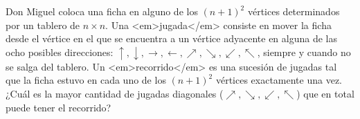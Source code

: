 Don Miguel coloca una ficha en alguno de los $(n+1)^2$ vértices determinados por un tablero de $n \times n$. Una <em>jugada</em> consiste en mover la ficha desde el vértice en el que se encuentra a un vértice adyacente en alguna de las ocho posibles direcciones: $\uparrow, \downarrow, \rightarrow, \leftarrow, \nearrow, \searrow, \swarrow, \nwarrow$, siempre y cuando no se salga del tablero. Un <em>recorrido</em> es una sucesión de jugadas tal que la ficha estuvo en cada uno de los $(n+1)^2$ vértices exactamente una vez. ¿Cuál es la mayor cantidad de jugadas diagonales ($\nearrow, \searrow, \swarrow, \nwarrow$) que en total puede tener el recorrido?
